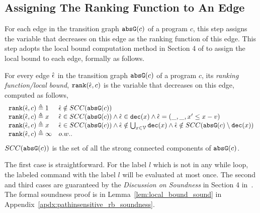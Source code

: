   \subsection{Assigning The Ranking Function to An Edge}
  For each edge in the transition graph $\mathtt{abs}{\mathtt{G}}(c)$ of a program $c$,
  this step assigns the variable that decreases on this edge as the ranking function   of this edge.
  This step adopts the local bound computation method in Section 4 of \cite{sinn2017complexity} to assign the local bound to each edge,
  formally as follows.
  \begin{defn}
    \label{def:ranking_gen}
  For every edge $\hat{\mathtt{\epsilon}{}}$ in the transition graph $\mathtt{abs}{\mathtt{G}}(c)$ of a program $c$,
  its \emph{ranking function/local bound}, $\mathtt{rank}(\hat{\mathtt{\epsilon}{}}, c)$
  is the variable that decreases on this edge, computed as follows,
  \[ 
  \begin{array}{ll}
    \mathtt{rank}(\hat{\mathtt{\epsilon}{}}, c) \triangleq 1 
    & \hat{\mathtt{\epsilon}{}} \notin SCC(\mathtt{abs}{\mathtt{G}}(c))
    \\
    \mathtt{rank}(\hat{\mathtt{\epsilon}{}}, c) \triangleq x
    & \hat{\mathtt{\epsilon}{}} \in SCC(\mathtt{abs}{\mathtt{G}}(c)) \land \hat{\mathtt{\epsilon}{}} \in \mathtt{dec}(x) \land  \hat{\mathtt{\epsilon}{}} = (\_, \_ , x' \leq x - v) \\
    \mathtt{rank}(\hat{\mathtt{\epsilon}{}}, c) \triangleq x
    & \hat{\mathtt{\epsilon}{}} \in SCC(\mathtt{abs}{\mathtt{G}}(c)) \land 
    \hat{\mathtt{\epsilon}{}}  \notin \bigcup_{x \in \mathcal{V}} \mathtt{dec}(x)
    \land \hat{\mathtt{\epsilon}{}} \notin SCC(\mathtt{abs}{\mathtt{G}}(c) \setminus \mathtt{dec}(x))\\
    \mathtt{rank}(\hat{\mathtt{\epsilon}{}}, c) \triangleq \infty
    & o.w..
  \end{array}
  \]
  $SCC(\mathtt{abs}{\mathtt{G}}(c))$ is the set of all the strong connected components of $\mathtt{abs}{\mathtt{G}}(c)$.
  \end{defn}
    The first case is straightforward. 
    For the label $l$ which is not in any while loop, 
    the labeled command with the label $l$ will be 
    evaluated at most once. 
    The second and third cases are guaranteed by the \emph{Discussion on Soundness} in Section 4 in~\cite{sinn2017complexity}.
    The formal soundness proof is in Lemma~\ref{lem:local_bound_sound} in Appendix~\ref{apdx:pathinsensitive_rb_soundness}.
